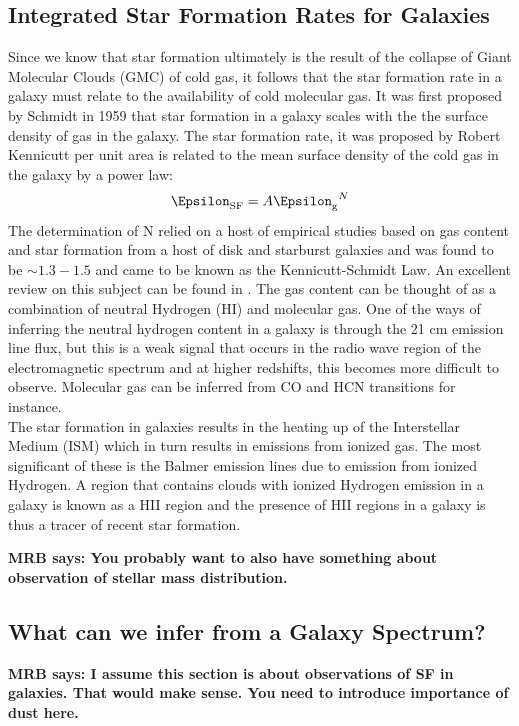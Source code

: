 \subsection{Integrated Star Formation Rates for Galaxies}

Since we know that star formation ultimately is the result of the collapse of Giant Molecular Clouds (GMC) of cold gas, it follows that the star formation rate in a galaxy must relate to the availability of cold molecular gas. It was first proposed by Schmidt in 1959 \citep{959ApJ...129..243S} that star formation in a galaxy scales with the the surface density of gas in the galaxy. The star formation rate, it was proposed by Robert Kennicutt \citet{1998ApJ...498..541K} per unit area is related to the mean surface density of the cold gas in the galaxy by a power law:\\
$$\Epsilon_{\rm SF}  = A{\Epsilon_{\rm g}}^N$$
The determination of N relied on a host of empirical studies based on gas content and star formation from a host of disk and starburst galaxies and was found to be $\sim 1.3-1.5$ and came to be known as the Kennicutt-Schmidt Law. An excellent review on this subject can be found in \citet{kennicutt_star_2012}. The gas content can be thought of as a combination of neutral Hydrogen (HI) and molecular gas. One of the ways of inferring the neutral hydrogen content in a galaxy is through the 21 cm emission line flux, but this is a weak signal that occurs in the radio wave region of the electromagnetic spectrum and at higher redshifts, this becomes more difficult to observe. Molecular gas can be inferred from CO and HCN transitions for instance.\\

The star formation in galaxies results in the heating up of the Interstellar Medium (ISM) which in turn results in emissions from ionized gas. The most significant of these is the Balmer emission lines due to emission from ionized Hydrogen. A region that contains clouds with ionized Hydrogen emission in a galaxy is known as a HII region and the presence of HII regions in a galaxy is thus a tracer of recent star formation.


{\bf MRB says: You probably want to also have something
about observation of stellar mass distribution.}

\subsection{What can we infer from a Galaxy Spectrum?}
{\bf MRB says: I assume this section is about observations 
of SF in galaxies. That would make sense. You need to 
introduce importance of dust here.}

